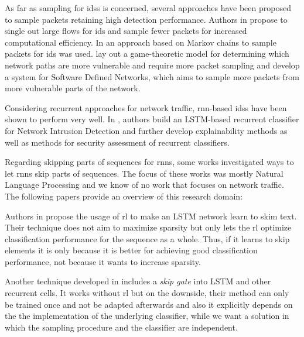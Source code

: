 \documentclass[conference]{IEEEtran}
\begin{document}
As far as sampling for \glspl{ids} is concerned, several approaches have been proposed to sample packets retaining high detection performance. Authors in \cite{estan_new_2003} propose to single out large flows for \gls{ids} and sample fewer packets for increased computational efficiency. In \cite{bakhoum_intrusion_2011} an approach based on Markov chains to sample packets for \gls{ids} was used. \cite{murali_kodialam_detecting_2003} lay out a game-theoretic model for determining which network paths are more vulnerable and require more packet sampling and \cite{ha_suspicious_2016} develop a system for Software Defined Networks, which aims to sample more packets from more vulnerable parts of the network.


Considering recurrent approaches for network traffic, \gls{rnn}-based \glspl{ids} have been shown to perform very well. In \cite{hartl_explainability_2020}, authors build an LSTM-based recurrent classifier for Network Intrusion Detection and further develop explainability methods as well as methods for security assessment of recurrent classifiers.


Regarding skipping parts of sequences for \glspl{rnn}, some works investigated ways to let \glspl{rnn} skip parts of sequences. The focus of these works was mostly Natural Language Processing and we know of no work that focuses on network traffic. The following papers provide an overview of this research domain:

Authors in \cite{yu_learning_2017} propose the usage of \gls{rl} to make an LSTM network learn to skim text. Their technique does not aim to maximize sparsity but only lets the \gls{rl} optimize classification performance for the sequence as a whole. Thus, if it learns to skip elements it is only because it is better for achieving good classification performance, not because it wants to increase sparsity.

Another technique developed in \cite{campos_skip_2018} includes a \textit{skip gate} into LSTM and other recurrent cells. It works without \gls{rl} but on the downside, their method can only be trained once and not be adapted afterwards and also it explicitly depends on the the implementation of the underlying classifier, while we want a solution in which the sampling procedure and the classifier are independent.
\end{document}

